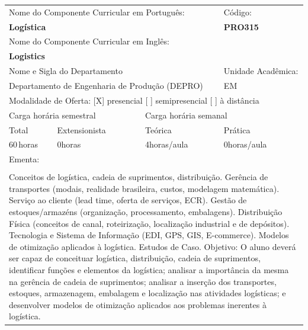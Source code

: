 \documentclass[11pt]{article}
\begin{document}
\begin{center}
\begin{longtable}{|p{4cm}|p{4cm}|p{4cm}|p{4cm}|}
\hline
\multicolumn{3}{|p{12cm}|}{Nome do Componente Curricular em Português:} &
\multicolumn{1}{p{4cm}|}{Código:} \\ 
\multicolumn{3}{|p{12cm}|}{\textbf{Logística}} &
\textbf{PRO315}\\ 
\multicolumn{3}{|p{12cm}|}{Nome do Componente Curricular em Inglês:} & \\ 
\multicolumn{3}{|p{12cm}|}{\textbf{Logistics}} & \\ 
\hline
\multicolumn{3}{|p{12cm}|}{Nome e Sigla do Departamento} & Unidade Acadêmica: \\ 
\multicolumn{3}{|p{12cm}|}{Departamento de Engenharia de Produção (DEPRO)} & {EM} \\ 
\hline
\multicolumn{4}{|p{16cm}|}{Modalidade de Oferta:
[X] presencial \hspace{0.6cm}
[ ] semipresencial \hspace{0.6cm}
[ ] à distância}\\
\hline
\multicolumn{2}{|p{8cm}|}{Carga horária semestral} &
\multicolumn{2}{p{8cm}|}{Carga horária semanal}\\
\hline
\multicolumn{1}{|p{4cm}|}{Total} &
\multicolumn{1}{p{4cm}|}{Extensionista} &
\multicolumn{1}{p{4cm}|}{Teórica} &
\multicolumn{1}{p{4cm}|}{Prática} \\ 
\multicolumn{1}{|p{4cm}|}{60\,horas} &
\multicolumn{1}{p{4cm}|}{0\;horas} &
\multicolumn{1}{p{4cm}|}{4\;horas/aula} &
\multicolumn{1}{p{4cm}|}{0\;horas/aula} \\ 
\hline
\multicolumn{4}{|p{16cm}|}{Ementa:}\\
\multicolumn{4}{|p{16cm}|}{}\\
\multicolumn{4}{|p{\dimexpr 16cm + 6\tabcolsep\relax}|}{Conceitos de logística, cadeia de suprimentos, distribuição. Gerência de transportes (modais, realidade brasileira, custos, modelagem matemática). Serviço ao cliente (lead time, oferta de serviços, ECR). Gestão de estoques/armazéns (organização, processamento, embalagens). Distribuição Física (conceitos de canal, roteirização, localização industrial e de depósitos). Tecnologia e Sistema de Informação (EDI, GPS, GIS, E-commerce). Modelos de otimização aplicados à logística. Estudos de Caso. Objetivo: O aluno deverá ser capaz de conceituar logística, distribuição, cadeia de suprimentos, identificar funções e elementos da logística; analisar a importância da mesma na gerência de cadeia de suprimentos; analisar a inserção dos transportes, estoques, armazenagem, embalagem e localização nas atividades logísticas; e desenvolver modelos de otimização aplicados aos problemas inerentes à logística.}\\

\end{longtable}
\end{center}
\end{document}
